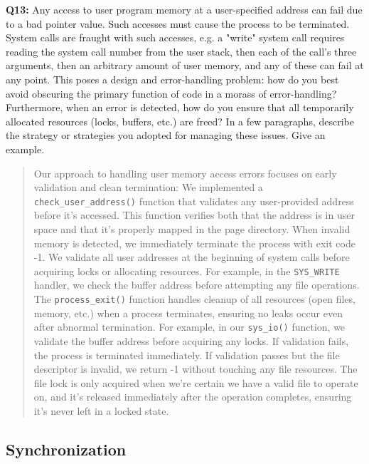 \documentclass[a4paper,11pt]{paper}
\begin{document}
\newpage
\textbf{Q13:} Any access to user program memory at a user-specified address can fail due to a bad pointer value.  Such accesses must cause the process to be terminated.  System calls are fraught with such accesses, e.g. a "write" system call requires reading the system call number from the user stack, then each of the call's three arguments, then an arbitrary amount of user memory, and any of these can fail at any point.  This poses a design and error-handling problem: how do you best avoid obscuring the primary function of code in a morass of error-handling?  Furthermore, when an error is detected, how do you ensure that all temporarily allocated resources (locks, buffers, etc.) are freed?  In a few paragraphs, describe the strategy or strategies you adopted for managing these issues.  Give an example.
\begin{quote}
Our approach to handling user memory access errors focuses on early validation and clean termination:
We implemented a \texttt{check\_user\_address()} function that validates any user-provided address before it's accessed. This function verifies both that the address is in user space and that it's properly mapped in the page directory. When invalid memory is detected, we immediately terminate the process with exit code -1.
We validate all user addresses at the beginning of system calls before acquiring locks or allocating resources. For example, in the \texttt{SYS\_WRITE} handler, we check the buffer address before attempting any file operations.\\
 The \texttt{process\_exit()} function handles cleanup of all resources (open files, memory, etc.) when a process terminates, ensuring no leaks occur even after abnormal termination.
For example, in our \texttt{sys\_io()} function, we validate the buffer address before acquiring any locks. If validation fails, the process is terminated immediately. If validation passes but the file descriptor is invalid, we return -1 without touching any file resources. The file lock is only acquired when we're certain we have a valid file to operate on, and it's released immediately after the operation completes, ensuring it's never left in a locked state.
\end{quote}

\newpage
\subsection{Synchronization}
\end{document}
